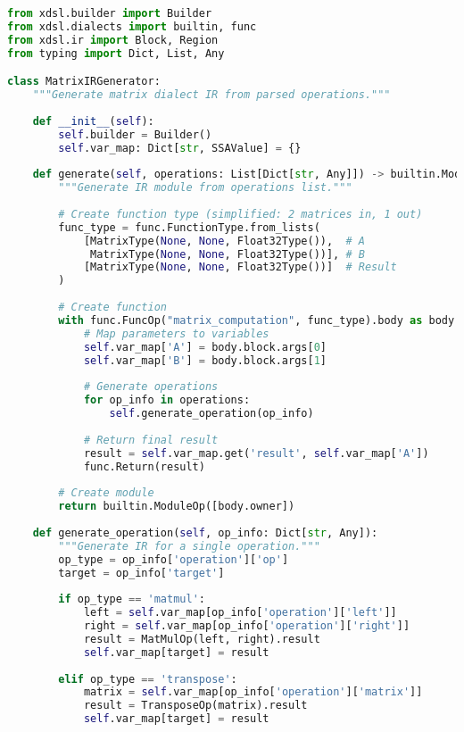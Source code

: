 \documentclass[11pt,a4paper]{article}
\begin{document}
\begin{lstlisting}[language=Python, caption=src/ir\_generator.py - IR Generation]
from xdsl.builder import Builder
from xdsl.dialects import builtin, func
from xdsl.ir import Block, Region
from typing import Dict, List, Any

class MatrixIRGenerator:
    """Generate matrix dialect IR from parsed operations."""
    
    def __init__(self):
        self.builder = Builder()
        self.var_map: Dict[str, SSAValue] = {}
    
    def generate(self, operations: List[Dict[str, Any]]) -> builtin.ModuleOp:
        """Generate IR module from operations list."""
        
        # Create function type (simplified: 2 matrices in, 1 out)
        func_type = func.FunctionType.from_lists(
            [MatrixType(None, None, Float32Type()),  # A
             MatrixType(None, None, Float32Type())], # B
            [MatrixType(None, None, Float32Type())]  # Result
        )
        
        # Create function
        with func.FuncOp("matrix_computation", func_type).body as body:
            # Map parameters to variables
            self.var_map['A'] = body.block.args[0]
            self.var_map['B'] = body.block.args[1]
            
            # Generate operations
            for op_info in operations:
                self.generate_operation(op_info)
            
            # Return final result
            result = self.var_map.get('result', self.var_map['A'])
            func.Return(result)
        
        # Create module
        return builtin.ModuleOp([body.owner])
    
    def generate_operation(self, op_info: Dict[str, Any]):
        """Generate IR for a single operation."""
        op_type = op_info['operation']['op']
        target = op_info['target']
        
        if op_type == 'matmul':
            left = self.var_map[op_info['operation']['left']]
            right = self.var_map[op_info['operation']['right']]
            result = MatMulOp(left, right).result
            self.var_map[target] = result
        
        elif op_type == 'transpose':
            matrix = self.var_map[op_info['operation']['matrix']]
            result = TransposeOp(matrix).result
            self.var_map[target] = result
        

\end{lstlisting}
\end{document}
